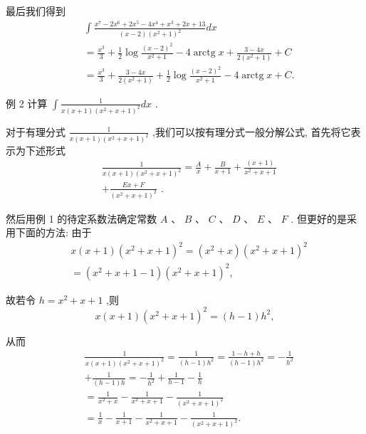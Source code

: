最后我们得到
\begin{align*}
	&\int \frac{{x}^{7} - 2{x}^{6} + 2{x}^{5} - 4{x}^{4} + {x}^{3} + {2x} + {13}}{\left( {x - 2}\right) {\left( {x}^{2} + 1\right) }^{2}}{dx}\\
	&= \frac{{x}^{3}}{3} + \frac{1}{2}\log \frac{{\left( x - 2\right) }^{2}}{{x}^{2} + 1} - 4\operatorname{arctg}x + \frac{3 - {4x}}{2\left( {{x}^{2} + 1}\right) } + C\\
	&= \frac{{x}^{3}}{3} + \frac{3 - {4x}}{2\left( {{x}^{2} + 1}\right) } + \frac{1}{2}\log \frac{{\left( x - 2\right) }^{2}}{{x}^{2} + 1} - 4\operatorname{arctg}x + C.
\end{align*}

例 2 计算 $\int \frac{1}{x\left( {x + 1}\right) {\left( {x}^{2} + x + 1\right) }^{2}}{dx}$ .

对于有理分式 $\frac{1}{x\left( {x + 1}\right) {\left( {x}^{2} + x + 1\right) }^{2}}$ ,我们可以按有理分式一般分解公式, 首先将它表示为下述形式
\begin{align*}
	&\frac{1}{x\left( {x + 1}\right) {\left( {x}^{2} + x + 1\right) }^{2}} = \frac{A}{x} + \frac{B}{x + 1} + \frac{\left( x + 1\right) }{{x}^{2} + x + 1}\\
	&+ \frac{{Ex} + F}{{\left( {x}^{2} + x + 1\right) }^{2}}\text{ . }
\end{align*}

然后用例 1 的待定系数法确定常数 $A\text{ 、 }B\text{ 、 }C\text{ 、 }D\text{ 、 }E\text{ 、 }F$ . 但更好的是采用下面的方法: 由于
\begin{align*}
	&x\left( {x + 1}\right) {\left( {x}^{2} + x + 1\right) }^{2} = \left( {{x}^{2} + x}\right) {\left( {x}^{2} + x + 1\right) }^{2}\\
	&= \left( {{x}^{2} + x + 1 - 1}\right) {\left( {x}^{2} + x + 1\right) }^{2},
\end{align*}

故若令 $h = {x}^{2} + x + 1$ ,则
$$x\left( {x + 1}\right) {\left( {x}^{2} + x + 1\right) }^{2} = \left( {h - 1}\right) {h}^{2},$$

从而
\begin{align*}
	&\frac{1}{x\left( {x + 1}\right) {\left( {x}^{2} + x + 1\right) }^{2}} = \frac{1}{\left( {h - 1}\right) {h}^{2}} = \frac{1 - h + h}{\left( {h - 1}\right) {h}^{2}} =  - \frac{1}{{h}^{2}}\\
	&+ \frac{1}{\left( {h - 1}\right) h} =  - \frac{1}{{h}^{2}} + \frac{1}{h - 1} - \frac{1}{h}\\
	&= \frac{1}{{x}^{2} + x} - \frac{1}{{x}^{2} + x + 1} - \frac{1}{{\left( {x}^{2} + x + 1\right) }^{2}}\\
	&= \frac{1}{x} - \frac{1}{x + 1} - \frac{1}{{x}^{2} + x + 1} - \frac{1}{{\left( {x}^{2} + x + 1\right) }^{2}}.
\end{align*}

